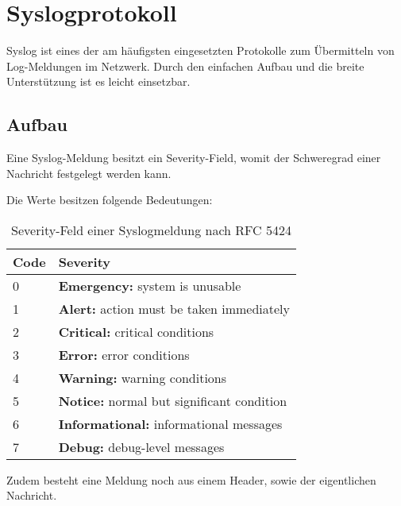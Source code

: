 \section{Syslogprotokoll}
\label{sec:Syslogprotokoll}

Syslog ist eines der am häufigsten eingesetzten Protokolle zum Übermitteln von Log-Meldungen im Netzwerk. Durch den einfachen Aufbau und die breite Unterstützung ist es leicht einsetzbar.


\subsection{ Aufbau}

Eine Syslog-Meldung besitzt ein Severity-Field, womit der Schweregrad einer Nachricht festgelegt werden kann.

\noindent Die Werte besitzen folgende Bedeutungen:

\begin{table}[H]
\begin{tabular}{|p{0.5in}|p{3.7in}|} \hline 
Code & \textbf{Severity} \\ \hline 
0 & \textbf{Emergency:} system is unusable \\ \hline 
1 & \textbf{Alert:} action must be taken immediately \\ \hline 
2 & \textbf{Critical:} critical conditions \\ \hline 
3 & \textbf{Error:} error conditions \\ \hline 
4 & \textbf{Warning:} warning conditions \\ \hline 
5 & \textbf{Notice:} normal but significant condition \\ \hline 
6 & \textbf{Informational:} informational messages \\ \hline 
7 & \textbf{Debug:} debug-level messages \\ \hline 
\end{tabular}
\caption{Severity-Feld einer Syslogmeldung nach RFC 5424}
\end{table}

Zudem besteht eine Meldung noch aus einem Header, sowie der eigentlichen Nachricht.